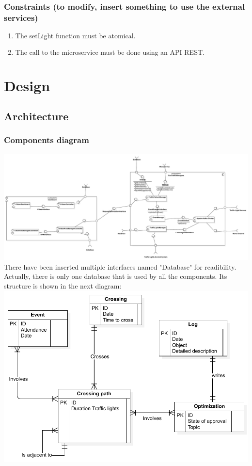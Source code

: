 \documentclass[12pt, a4paper, twoside, openright]{report}
\begin{document}
\subsection{Constraints (to modify, insert something to use the
external services)}

\begin{enumerate}
\item
  The setLight function must be atomical.
\item
  The call to the microservice must be done using an API REST.
\end{enumerate}

\chapter{Design}

\section{Architecture}
\subsection{Components diagram}

\includegraphics[width=\linewidth]{images/svg/ComponentDiagram.pdf}
There have been inserted multiple interfaces named "Database" for readibility. Actually, there is only one database that is used by all the components.
Its structure is shown in the next diagram:
\includegraphics[width=\linewidth]{images/svg/ERDDiagram.pdf}
\end{document}
